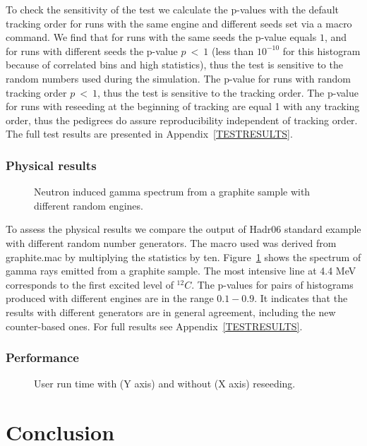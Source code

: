 \documentclass[a4paper, titlepage, 12pt]{article} %
\begin{document}
   To check the sensitivity of the test we calculate the p-values with the default tracking order for runs with the same engine and different seeds set via a macro command.
   We find that for runs with the same seeds the p-value equals $1$, and for runs with different seeds the p-value $p\ <\ 1$ (less than $10^{-10}$ for this histogram because of correlated bins and high statistics), thus the test is sensitive to the random numbers used during the simulation.
   The p-value for runs with random tracking order $p\ <\ 1$, thus the test is sensitive to the tracking order.
   The p-value for runs with reseeding at the beginning of tracking are equal 1 with any tracking order, thus the pedigrees do assure reproducibility independent of tracking order.
   The full test results are presented in Appendix~\ref{TESTRESULTS}.
  \subsubsection{Physical results}
   \begin{figure}
    \label{GAMMASPECTRUM}
    \scalebox{.8}{}
    \caption{Neutron induced gamma spectrum from a graphite sample with different random engines.}
   \end{figure}
   To assess the physical results we compare the output of Hadr06 standard example with different random number generators.
   The macro used was derived from graphite.mac by multiplying the statistics by ten.
   Figure~\ref{GAMMASPECTRUM} shows the spectrum of gamma rays emitted from a graphite sample.
   The most intensive line at 4.4 MeV corresponds to the first excited level of $^{12}C$.
   The p-values for pairs of histograms produced with different engines are in the range $0.1 - 0.9$.
   It indicates that the results with different generators are in general agreement, including the new counter-based ones.
   For full results see Appendix~\ref{TESTRESULTS}.
  
  \subsubsection{Performance}
  \begin{figure}
   \label{USERTIME}
   \scalebox{.8}{}
   \caption{User run time with (Y axis) and without (X axis) reseeding.}
  \end{figure}
 
 
 \section{Conclusion}
 
\end{document}
